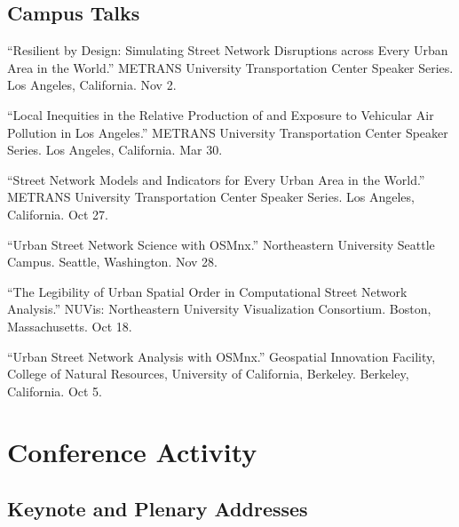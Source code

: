 \documentclass[11pt,a4paper]{report} %
\begin{document}
\subsection*{Campus Talks}

\begin{tablist}


\item[2023] \tab{}\enquote{Resilient by Design: Simulating Street Network Disruptions across Every Urban Area in the World.} METRANS University Transportation Center Speaker Series. Los Angeles, California. Nov 2.

\item[2022] \tab{}\enquote{Local Inequities in the Relative Production of and Exposure to Vehicular Air Pollution in Los Angeles.} METRANS University Transportation Center Speaker Series. Los Angeles, California. Mar 30.

\item[2020] \tab{}\enquote{Street Network Models and Indicators for Every Urban Area in the World.} METRANS University Transportation Center Speaker Series. Los Angeles, California. Oct 27.

\item[2018] \tab{}\enquote{Urban Street Network Science with OSMnx.} Northeastern University Seattle Campus. Seattle, Washington. Nov 28.

\item[2018] \tab{}\enquote{The Legibility of Urban Spatial Order in Computational Street Network Analysis.} NUVis: Northeastern University Visualization Consortium. Boston, Massachusetts. Oct 18.

\item[2017] \tab{}\enquote{Urban Street Network Analysis with OSMnx.} Geospatial Innovation Facility, College of Natural Resources, University of California, Berkeley. Berkeley, California. Oct 5.

\end{tablist}

\section*{Conference Activity}

\subsection*{Keynote and Plenary Addresses}
\end{document}

